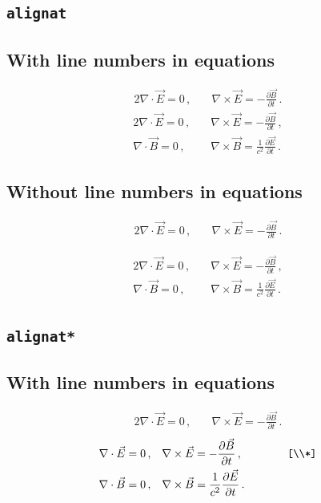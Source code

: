 \subsection*{\texttt{alignat}}

\subsection*{With line numbers in equations}
\nextlipsum
\begin{alignat}{2}
  \nabla \cdot \vec E = 0 \,, &\quad \nabla \times \vec E = - \frac{\partial \vec B}{\partial t} \,.
\end{alignat}
\nextlipsum
\begin{alignat}{2}
  \nabla \cdot \vec E = 0 \,, &\quad \nabla \times \vec E = - \frac{\partial \vec B}{\partial t} \,, \\
  \nabla \cdot \vec B = 0 \,, &\quad \nabla \times \vec B = \frac{1}{c^2} \frac{\partial \vec E}{\partial t} \,.
\end{alignat}
\nextlipsum

\subsection*{Without line numbers in equations}
\nextlipsum
\begin{linenomath*}
\begin{alignat}{2}
  \nabla \cdot \vec E = 0 \,, &\quad \nabla \times \vec E = - \frac{\partial \vec B}{\partial t} \,.
\end{alignat}
\end{linenomath*}
\nextlipsum
\begin{linenomath*}
\begin{alignat}{2}
  \nabla \cdot \vec E = 0 \,, &\quad \nabla \times \vec E = - \frac{\partial \vec B}{\partial t} \,, \\
  \nabla \cdot \vec B = 0 \,, &\quad \nabla \times \vec B = \frac{1}{c^2} \frac{\partial \vec E}{\partial t} \,.
\end{alignat}
\end{linenomath*}
\nextlipsum

\subsection*{\texttt{alignat*}}

\subsection*{With line numbers in equations}
\nextlipsum
\begin{alignat*}{2}
  \nabla \cdot \vec E = 0 \,, &\quad \nabla \times \vec E = - \frac{\partial \vec B}{\partial t} \,.
\end{alignat*}
\nextlipsum
\begin{alignat*}{2}
  \nabla \cdot \vec E = 0 \,, &\quad \nabla \times \vec E = - \frac{\partial \vec B}{\partial t} \,, \qquad\qquad\texttt{[\textbackslash\textbackslash{}*]}\\*
  \nabla \cdot \vec B = 0 \,, &\quad \nabla \times \vec B = \frac{1}{c^2} \frac{\partial \vec E}{\partial t} \,.
\end{alignat*}
\nextlipsum

